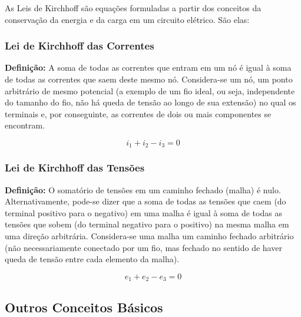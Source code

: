 \documentclass{article}
\numberwithin{equation}{section}
\begin{document}
As Leis de Kirchhoff são equações formuladas a partir dos conceitos da conservação da energia e da carga em um circuito elétrico. São elas:

\subsubsection{Lei de Kirchhoff das Correntes}
\label{subsubsec:KCL}
\textbf{Definição:} A soma de todas as correntes que entram em um nó é igual à soma de todas as correntes que saem deste mesmo nó. Considera-se um nó, um ponto arbitrário de mesmo potencial (a exemplo de um fio ideal, ou seja, independente do tamanho do fio, não há queda de tensão ao longo de sua extensão) no qual os terminais e, por conseguinte, as correntes de dois ou mais componentes se encontram.
\begin{center}
    $$i_{1}+i_{2}-i_{3} = 0$$
\end{center}

\subsubsection{Lei de Kirchhoff das Tensões}
\label{subsubsec:KVL}
\textbf{Definição:} O somatório de tensões em um caminho fechado (malha) é nulo. Alternativamente, pode-se dizer que a soma de todas as tensões que caem (do terminal positivo para o negativo) em uma malha é igual à soma de todas as tensões que sobem (do terminal negativo para o positivo) na mesma malha em uma direção arbitrária. Considera-se uma malha um caminho fechado arbitrário (não necessariamente conectado por um fio, mas fechado no sentido de haver queda de tensão entre cada elemento da malha).
\begin{center}
    $$e_{1}+e_{2}-e_{3}=0$$
\end{center}

\subsection{Outros Conceitos Básicos}
\label{subsec:def}
\end{document}
